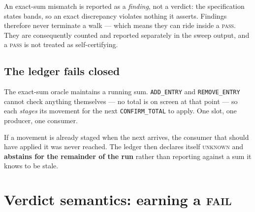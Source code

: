 \documentclass[11pt,a4paper]{article}
\newcommand{\gate}[1]{\texttt{\small #1}}
\begin{document}
An exact-sum mismatch is reported as a \emph{finding}, not a verdict: the
specification states bands, so an exact discrepancy violates nothing it asserts.
Findings therefore never terminate a walk --- which means they can ride inside a
\textsc{pass}. They are consequently counted and reported separately in the sweep
output, and a \textsc{pass} is not treated as self-certifying.

\subsection{The ledger fails closed}

The exact-sum oracle maintains a running sum. \gate{ADD\_ENTRY} and
\gate{REMOVE\_ENTRY} cannot check anything themselves --- no total is on screen at
that point --- so each \emph{stages} its movement for the next
\gate{CONFIRM\_TOTAL} to apply. One slot, one producer, one consumer.

If a movement is already staged when the next arrives, the consumer that should
have applied it was never reached. The ledger then declares itself \textsc{unknown}
and \textbf{abstains for the remainder of the run} rather than reporting against a
sum it knows to be stale.

\medskip
\noindent{}

\section{Verdict semantics: earning a \textsc{fail}}
\end{document}
